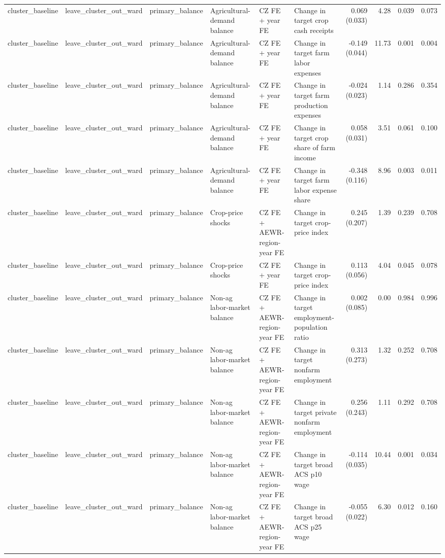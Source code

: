 \begin{tabular}{llllllrrrr}
cluster_baseline & leave_cluster_out_ward & primary_balance & Agricultural-demand balance & CZ FE + year FE & Change in target crop cash receipts & 0.069 (0.033) & 4.28 & 0.039 & 0.073 \\
cluster_baseline & leave_cluster_out_ward & primary_balance & Agricultural-demand balance & CZ FE + year FE & Change in target farm labor expenses & -0.149 (0.044) & 11.73 & 0.001 & 0.004 \\
cluster_baseline & leave_cluster_out_ward & primary_balance & Agricultural-demand balance & CZ FE + year FE & Change in target farm production expenses & -0.024 (0.023) & 1.14 & 0.286 & 0.354 \\
cluster_baseline & leave_cluster_out_ward & primary_balance & Agricultural-demand balance & CZ FE + year FE & Change in target crop share of farm income & 0.058 (0.031) & 3.51 & 0.061 & 0.100 \\
cluster_baseline & leave_cluster_out_ward & primary_balance & Agricultural-demand balance & CZ FE + year FE & Change in target farm labor expense share & -0.348 (0.116) & 8.96 & 0.003 & 0.011 \\
cluster_baseline & leave_cluster_out_ward & primary_balance & Crop-price shocks & CZ FE + AEWR-region-year FE & Change in target crop-price index & 0.245 (0.207) & 1.39 & 0.239 & 0.708 \\
cluster_baseline & leave_cluster_out_ward & primary_balance & Crop-price shocks & CZ FE + year FE & Change in target crop-price index & 0.113 (0.056) & 4.04 & 0.045 & 0.078 \\
cluster_baseline & leave_cluster_out_ward & primary_balance & Non-ag labor-market balance & CZ FE + AEWR-region-year FE & Change in target employment-population ratio & 0.002 (0.085) & 0.00 & 0.984 & 0.996 \\
cluster_baseline & leave_cluster_out_ward & primary_balance & Non-ag labor-market balance & CZ FE + AEWR-region-year FE & Change in target nonfarm employment & 0.313 (0.273) & 1.32 & 0.252 & 0.708 \\
cluster_baseline & leave_cluster_out_ward & primary_balance & Non-ag labor-market balance & CZ FE + AEWR-region-year FE & Change in target private nonfarm employment & 0.256 (0.243) & 1.11 & 0.292 & 0.708 \\
cluster_baseline & leave_cluster_out_ward & primary_balance & Non-ag labor-market balance & CZ FE + AEWR-region-year FE & Change in target broad ACS p10 wage & -0.114 (0.035) & 10.44 & 0.001 & 0.034 \\
cluster_baseline & leave_cluster_out_ward & primary_balance & Non-ag labor-market balance & CZ FE + AEWR-region-year FE & Change in target broad ACS p25 wage & -0.055 (0.022) & 6.30 & 0.012 & 0.160 \\

\end{tabular}
